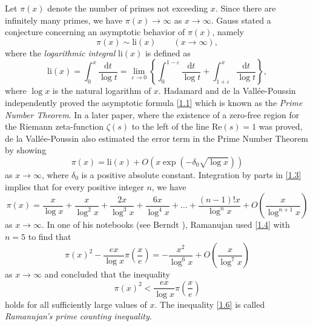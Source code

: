 \documentclass[a4paper,12pt]{amsart}
\newcommand{\e}{\varepsilon}
\theoremstyle{definition}
\theoremstyle{remark}
\begin{document}
Let $\pi(x)$ denote the number of primes not exceeding $x$. Since there are infinitely many primes, we have $\pi(x) \to \infty$ as $x \to \infty$. Gauss \cite{gauss} stated a conjecture concerning an asymptotic behavior of $\pi(x)$, namely
\begin{equation}
\pi(x) \sim \text{li}(x) \quad\quad (x \to \infty), \tag{1.1} \label{1.1}
\end{equation}
where the \emph{logarithmic integral} $\text{li}(x)$ is defined as
\begin{equation}
\text{li}(x) = \int_0^x \frac{\text{d}t}{\log t} = \lim_{\e \to 0} \left \{ \int_{0}^{1-\e}{\frac{\text{d}t}{\log t}} + \int_{1+\e}^{x}{\frac{\text{d}t}{\log 
t}} \right \}, \tag{1.2} \label{1.2}
\end{equation}
where $\log x$ is the natural logarithm of $x$. Hadamard \cite{hadamard1896} and de la Vall\'{e}e-Poussin \cite{vallee1896} independently proved the asymptotic formula \eqref{1.1} which is known as the \textit{Prime Number Theorem}. In a later paper, \cite{vallee1899}
where the existence of a zero-free region for the Riemann zeta-function $\zeta(s)$ to the left of the line $\text{Re}(s) = 1$ was proved, de la Vall\'{e}e-Poussin also estimated the error term in the Prime Number Theorem by showing
\begin{equation}
\pi(x) = \text{li}(x) + O(x \exp(-\delta_0\sqrt{\log x})) \tag{1.3} \label{1.3}
\end{equation} 
as $x \to \infty$, where $\delta_0$ is a positive absolute constant. Integration by parts in \eqref{1.3} implies that for every positive integer $n$, we have
\begin{equation}
\pi(x) = \frac{x}{\log x} + \frac{x}{\log^2 x} + \frac{2x}{\log^3 x} + \frac{6x}{\log^4 x} + \ldots + \frac{(n-1)! x}{\log^nx} + O \left( \frac{x}{\log^{n+1} x} \right) \tag{1.4} \label{1.4}
\end{equation}
as $x \to \infty$. In one of his notebooks (see Berndt \cite{berndt1994}), 
Ramanujan used \eqref{1.4} with $n = 5$ to find that
\begin{displaymath}
\pi(x)^2 - \frac{ex}{\log x} \pi \left( \frac{x}{e} \right)  = - \frac{x^2}{\log^6x} + O \left( \frac{x}{\log^7 x} \right) \tag{1.5} \label{1.5}
\end{displaymath}
as $x \to \infty$ and concluded that the inequality
\begin{equation}
\pi(x)^2 < \frac{ex}{\log x} \pi \left( \frac{x}{e} \right) \tag{1.6} \label{1.6}
\end{equation}
holds for all sufficiently large values of $x$. The inequality \eqref{1.6} is called \textit {Ramanujan's prime counting inequality}.
\end{document}
